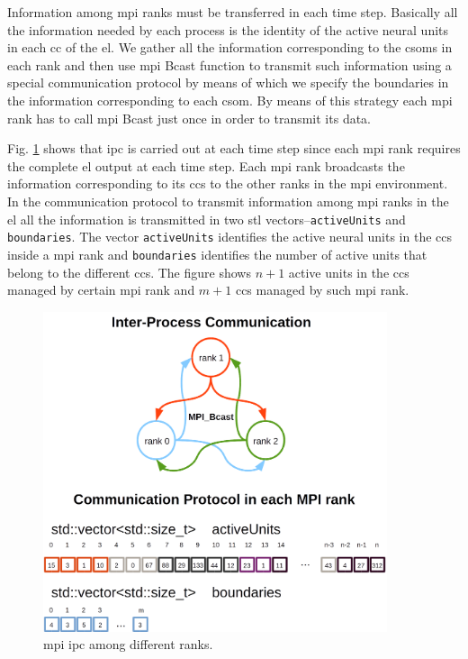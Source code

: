 {Information among \gls{mpi} ranks must be transferred in each time step. Basically all the information needed by each process is the identity of the active neural units in each \gls{cc} of the \gls{el}. We gather all the information corresponding to the \glspl{csom} in each rank and then use \gls{mpi} Bcast function to transmit such information using a special communication protocol by means of which we specify the boundaries in the information corresponding to each \gls{csom}. By means of this strategy each \gls{mpi} rank has to call \gls{mpi} Bcast just once in order to transmit its data.

Fig. \ref{fig:BCast} shows that \gls{ipc} is carried out at each time step since each \gls{mpi} rank requires the complete \gls{el} output at each time step. Each \gls{mpi} rank broadcasts the information corresponding to its \glspl{cc} to the other ranks in the \gls{mpi} environment. In the communication protocol to transmit information among \gls{mpi} ranks in the \gls{el} all the information is transmitted in two \gls{stl} vectors--\texttt{activeUnits} and \texttt{boundaries}. The vector \texttt{activeUnits} identifies the active neural units in the \glspl{cc} inside a \gls{mpi} rank and \texttt{boundaries} identifies the number of active units that belong to the different \glspl{cc}. The figure shows $n+1$ active units in the \glspl{cc} managed by certain \gls{mpi} rank and $m+1$ \glspl{cc} managed by such \gls{mpi} rank.

\begin{figure}[h!]
    \centering
    \includegraphics[width=0.9\textwidth]{BCast.png}
    \caption{\gls{mpi} \gls{ipc} among different ranks.}
    \label{fig:BCast}
\end{figure}

}
